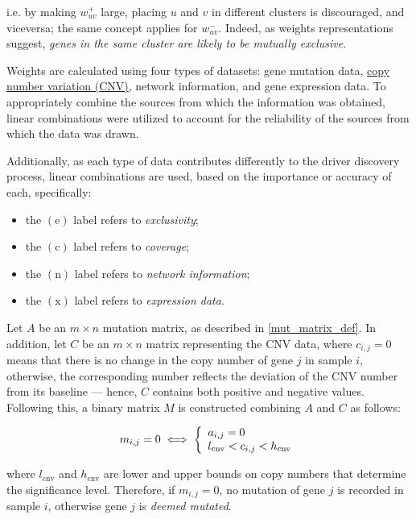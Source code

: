 i.e. by making $w_{uv}^+$ large, placing $u$ and $v$ in different clusters is discouraged, and viceversa; the same concept applies for $w_{uv}^-$. Indeed, as weights representations suggest, \textit{genes in the same cluster are likely to be mutually exclusive}.

Weights are calculated using four types of datasets: gene mutation data, \href{https://www.genome.gov/genetics-glossary/Copy-Number-Variation}{copy number variation (CNV)}, network information, and gene expression data. To appropriately combine the sources from which the information was obtained, linear combinations were utilized to account for the reliability of the sources from which the data was drawn.

Additionally, as each type of data contributes differently to the driver discovery process, linear combinations are used, based on the importance or accuracy of each, specifically:

\begin{itemize}
    \item the $(\mathrm e)$ label refers to \textit{exclusivity};
    \item the $(\mathrm c)$ label refers to \textit{coverage};
    \item the $(\mathrm n)$ label refers to \textit{network information};
    \item the $(\mathrm x)$ label refers to \textit{expression data}.
\end{itemize}

Let $A$ be an $m \times n$ mutation matrix, as described in \cref{mut_matrix_def}. In addition, let $C$ be an $m \times n$ matrix representing the CNV data, where $c_{i, j} = 0$ means that there is no change in the copy number of gene $j$ in sample $i$, otherwise, the corresponding number reflects the deviation of the CNV number from its baseline --- hence, $C$ contains both positive and negative values. Following this, a binary matrix $M$ is constructed combining $A$ and $C$ as follows:

\begin{equation}
    m_{i, j} = 0 \iff \soe{l}{a_{i, j} = 0 \\ l_{\mathrm{cnv}} < c_{i, j} < h_{\mathrm{cnv}}}
\end{equation}

where $l_{\mathrm{cnv}}$ and $h_{\mathrm{cnv}}$ are lower and upper bounds on copy numbers that determine the significance level.  Therefore, if $m_{i, j} = 0$, no mutation of gene $j$ is recorded in sample $i$, otherwise gene $j$ is \textit{deemed mutated}.


